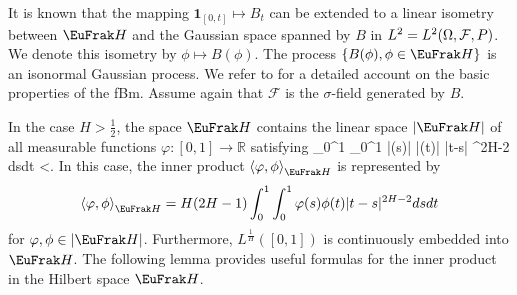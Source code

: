 \documentclass[a4paper]{article}
\numberwithin{equation}{section}
\def\mfh{{\EuFrak H}}
\def\HH{\EuFrak H}
\begin{document}
It is known that the mapping $\mathbf{1}_{[0,t]}\mapsto B_{t}$ can be extended to a
linear isometry between $\EuFrak H$ and the Gaussian space
spanned by $B$ in $L^2=L^2(\Omega,{\mathcal F},P)$.
We denote this isometry by $\phi \mapsto B(\phi )$. 
The process $\{B(\phi ), \phi \in \EuFrak H\}$ is  an isonormal Gaussian process.
We refer to \cite{Nualart2006} for a detailed account on the basic properties of {\color {black} the fBm. Assume again that $\mathcal{F}$ is the $\sigma$-field generated by $B$}.

In the case $H>\frac 12$, the space  $\EuFrak H$ contains 
the linear space $|\mfh|$ of all measurable functions $\varphi: [0,1] \rightarrow \mathbb{R}$ satisfying 
\beas\label{20170504-7}
\int_0^1 \int_0^1 |\varphi(s)| |\varphi(t)| |t-s| ^{2H-2} dsdt <\infty. 
\eeas
In this case, the inner product $\left\langle \varphi, \phi  \right\rangle _{\EuFrak H} $ is represented by 
\begin{equation}  \label{eq7}
\left\langle \varphi, \phi  \right\rangle _{\EuFrak H} =
H(2H-1)  \int_0^1 \int_0^1  \varphi(s)   \phi(t) |t-s| ^{2H-2} dsdt
\end{equation}
for $\varphi,\phi\in|\mfh|$. 
Furthermore, $L^{\frac 1H}([0,1])$ is continuously embedded into $\EuFrak H$. 
The following lemma provides useful formulas for the inner product in the Hilbert space $\HH$.
\end{document}
